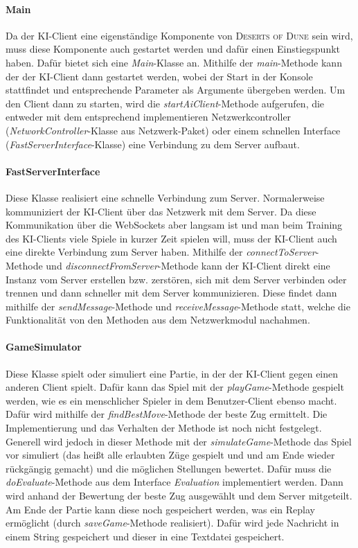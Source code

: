 \documentclass[12pt]{article}
\newcommand{\class}[1]{\textit{#1}-Klasse}
\newcommand{\method}[1]{\textit{#1}-Methode}
\newcounter{fa}
\begin{document}
\paragraph{Main}
Da der KI-Client eine eigenständige Komponente von \textsc{Deserts of Dune} sein wird, muss diese Komponente auch gestartet werden und dafür einen Einstiegspunkt haben. Dafür bietet sich eine \class{Main} an. Mithilfe der \method{main} kann der der KI-Client dann gestartet werden, wobei der Start in der Konsole stattfindet und entsprechende Parameter als Argumente übergeben werden. Um den Client dann zu starten, wird die \method{startAiClient} aufgerufen, die entweder mit dem entsprechend implementieren Netzwerkcontroller (\class{NetworkController} aus Netzwerk-Paket) oder einem schnellen Interface (\class{FastServerInterface}) eine Verbindung zu dem Server aufbaut.
\paragraph{FastServerInterface}
Diese Klasse realisiert eine schnelle Verbindung zum Server. Normalerweise kommuniziert der KI-Client über das Netzwerk mit dem Server. Da diese Kommunikation über die WebSockets aber langsam ist und man beim Training des KI-Clients viele Spiele in kurzer Zeit spielen will, muss der KI-Client auch eine direkte Verbindung zum Server haben. Mithilfe der \method{connectToServer} und \method{disconnectFromServer} kann der KI-Client direkt eine Instanz vom Server erstellen bzw. zerstören, sich mit dem Server verbinden oder trennen und dann schneller mit dem Server kommunizieren. Diese findet dann mithilfe der \method{sendMessage} und \method{receiveMessage} statt, welche die Funktionalität von den Methoden aus dem Netzwerkmodul nachahmen. 
\paragraph{GameSimulator}
Diese Klasse spielt oder simuliert eine Partie, in der der KI-Client gegen einen anderen Client spielt. Dafür kann das Spiel mit der \method{playGame} gespielt werden, wie es ein menschlicher Spieler in dem Benutzer-Client ebenso macht. Dafür wird mithilfe der \method{findBestMove} der beste Zug ermittelt. Die Implementierung und das Verhalten der Methode ist noch nicht festgelegt. Generell wird jedoch in dieser Methode mit der \method{simulateGame} das Spiel vor simuliert (das heißt alle erlaubten Züge gespielt und und am Ende wieder rückgängig gemacht) und die möglichen Stellungen bewertet. Dafür muss die \method{doEvaluate} aus dem Interface \textit{Evaluation} implementiert werden. Dann wird anhand der Bewertung der beste Zug ausgewählt und dem Server mitgeteilt. Am Ende der Partie kann diese noch gespeichert werden, was ein Replay ermöglicht (durch \method{saveGame} realisiert). Dafür wird jede Nachricht in einem String gespeichert und dieser in eine Textdatei gespeichert. 
\end{document}
